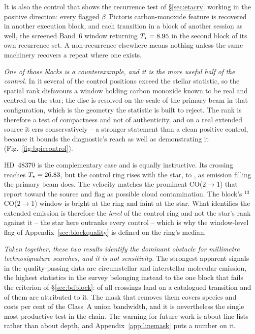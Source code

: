It is also the control that shows the recurrence test of
\S\ref{sec:etacrv} working in the positive direction: every flagged
$\beta$~Pictoris carbon-monoxide feature is recovered in another execution
block, and each transition in a block of another session as well, the
screened Band~6 window returning
$T_\star=8.95{}$ in the second block of its own recurrence set. A
non-recurrence elsewhere means nothing unless the same machinery recovers a
repeat where one exists.

\emph{One of those blocks is a counterexample, and it is the more useful half
of the control.} In it several of the \NCtrl{} control positions exceed the
stellar statistic, so the spatial rank disfavours a window holding carbon
monoxide known to be real and centred on the star; the disc is resolved on
the scale of the primary beam in that configuration, which is the geometry
the statistic is built to reject. The rank is therefore a test of
compactness and not of authenticity, and on a real extended source it errs
conservatively -- a stronger statement than a clean positive control, because
it bounds the diagnostic's reach as well as demonstrating it
(Fig.~\ref{fig:bpiccontrol}).



HD~48370 is the complementary case and is equally instructive. Its crossing
reaches $T_\star=26.83$, but the control ring rises with the star, to
\HdRingMax, as emission filling the primary beam does. The velocity matches
the prominent CO($2{\to}1$) that \citet{Cataldi2023} report toward the
source and flag as possible cloud contamination. The block's
$^{13}$CO($2{\to}1$) window is bright at the ring and faint at the star.
What identifies the extended emission is therefore the \emph{level} of the
control ring and not the star's rank against it -- the star here outranks
every control -- which is why the window-level flag of
Appendix~\ref{sec:blockquality} is defined on the ring's median.

\emph{Taken together, these two results identify the dominant obstacle for
millimetre technosignature searches, and it is not sensitivity.} The
strongest apparent signals in the quality-passing data are circumstellar and
interstellar molecular emission, the \DqBlockNCross{} highest statistics in the
survey belonging instead to the one block that fails the criterion of
\S\ref{sec:bdblock}: \MkNCoinc{} of all \NCross{} crossings land
on a catalogued transition and \NAttributed{} of them are attributed to it.
The mask that
removes them covers \FrNSpec{} species and costs \MkMaskAPct{} per cent of
the Class~A union bandwidth, and it is nevertheless the single most
productive test in the chain. The warning for
future work is about line lists rather than about depth, and
Appendix~\ref{app:linemask} puts a number on it.


